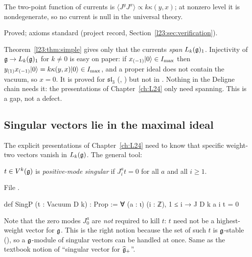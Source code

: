 \begin{physics}
The two-point function of currents is $\langle J^y J^x\rangle\propto k\kappa(y,x)$; at nonzero level it is nondegenerate,
so no current is null in the universal theory.
\end{physics}

\begin{status}
Proved; axioms standard (project record, Section~\ref{l23:sec:verification}).
\end{status}

\begin{warning}[title={Trap: $\lxxiiiL_1\cong\lxxiiig$ is not stated for general $\lxxiiig$}]\label{l23:warn:simpleweightone}
Theorem~\ref{l23:thm:simple} gives only that the currents \emph{span} $L_k(\mathfrak g)_1$. Injectivity of $\mathfrak g\to L_k(\mathfrak g)_1$ for $k\ne0$
is easy on paper: if $x_{(-1)}|0\rangle\in I_{\max}$ then $y_{(1)}x_{(-1)}|0\rangle=k\kappa(y,x)|0\rangle\in I_{\max}$, and a proper
ideal does not contain the vacuum, so $x=0$. It is proved for $\mathfrak{sl}_3$ (,
) but not in . Nothing in the Deligne chain needs it: the presentations of
Chapter~\ref{ch:L24} only need spanning. This is a gap, not a defect.
\end{warning}

\subsection{Singular vectors lie in the maximal ideal}

The explicit presentations of Chapter~\ref{ch:L24} need to know that specific weight-two vectors vanish in $L_k(\mathfrak g)$. The general tool:

\begin{definition}\label{l23:def:singP}
$t\in V^k(\mathfrak g)$ is \emph{positive-mode singular} if $J^a_i t=0$ for all $a$ and all $i\ge1$.
\end{definition}
\noindent File .
\begin{leancode}
def SingP (t : Vacuum D k) : Prop := ∀ (a : ι) (i : ℤ), 1 ≤ i → J D k a i t = 0
\end{leancode}

\begin{dictionary}
Note that the zero modes $J^a_0$ are \emph{not} required to kill $t$: $t$ need not be a highest-weight vector for $\lxxiiig$.
This is the right notion because the set of such $t$ is $\lxxiiig$-stable (), so a $\lxxiiig$-module of singular
vectors can be handled at once. Same as the textbook notion of ``singular vector for $\widehat{\mathfrak g}_+$''.
\end{dictionary}

